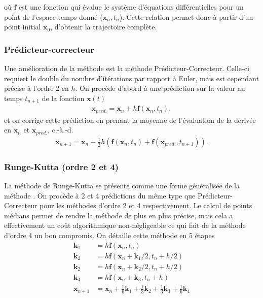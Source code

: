     où $\bm{f}$ est une fonction qui évalue le système d'équations différentielles pour un point de l'espace-temps donné ($\bm{x}_n, t_n$). Cette relation permet donc à partir d'un point initial $\bm{x}_0$, d'obtenir la trajectoire complète.

    \subsubsection{Prédicteur-correcteur} \label{subsubsec: pred-corr}
    Une amélioration de la méthode  est la méthode Prédicteur-Correcteur. Celle-ci requiert le double du nombre d'itérations par rapport à Euler, mais est cependant précise à l'ordre 2 en $h$. On procède d'abord à une prédiction sur la valeur au temps $t_{n + 1}$ de la fonction $\bm{x}(t)$
    \begin{align*}
        \bm{x}_{pred.} = \bm{x}_n + h\bm{f}(\bm{x}_n, t_n),
    \end{align*}
    et on corrige cette prédiction en prenant la moyenne de l'évaluation de la dérivée en $\bm{x}_n$ et $\bm{x}_{pred.}$, c.-à.-d.
    \begin{align*}
        \bm{x}_{n + 1} = \bm{x}_n + \frac{1}{2}h(\bm{f}(\bm{x}_n, t_n) + \bm{f}(\bm{x}_{pred.}, t_{n + 1})).
    \end{align*}

    \subsubsection{Runge-Kutta (ordre 2 et 4)} \label{subsubsec: runge-kutta}
    La méthode de Runge-Kutta se présente comme une forme généralisée de la méthode . On procède à 2 et 4 prédictions du même type que Prédicteur-Correcteur pour les méthodes d'ordre 2 et 4 respectivement. Le calcul de points médians permet de rendre la méthode de plus en plus précise, mais cela a effectivement un coût algorithmique non-négligeable ce qui fait de la méthode d'ordre 4 un bon compromis. On détaille cette méthode en 5 étapes
    \begin{align*}
        \bm{k}_1 &= h\bm{f}(\bm{x}_n, t_n) \\
        \bm{k}_2 &= h\bm{f}(\bm{x}_n + \bm{k}_1/2, t_n + h/2) \\
        \bm{k}_2 &= h\bm{f}(\bm{x}_n + \bm{k}_2/2, t_n + h/2) \\
        \bm{k}_4 &= h\bm{f}(\bm{x}_n + \bm{k}_3, t_n + h) \\
        \bm{x}_{n + 1} &= \bm{x}_n + \frac{1}{6}\bm{k}_1 + \frac{1}{3}\bm{k}_2 + \frac{1}{3}\bm{k}_3 + \frac{1}{6}\bm{k}_4
    \end{align*}

